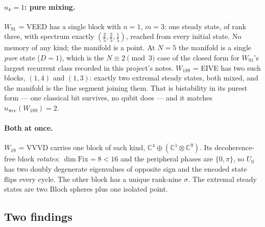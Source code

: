 \documentclass[11pt]{article}
\theoremstyle{plain}
\theoremstyle{definition}
\theoremstyle{remark}
\begin{document}
\paragraph{$n_k = 1$: pure mixing.} $W_{91}$ = VEED has a single block with $n =
1$, $m = 3$: one steady state, of rank three, with spectrum exactly
$(\tfrac25,\tfrac25,\tfrac15)$, reached from every initial state. No memory of
any kind; the manifold is a point. At $N = 5$ the manifold is a single
\emph{pure} state ($D = 1$), which is the $N \equiv 2 \pmod 3$ case of the
closed form for $W_{91}$'s largest recurrent class recorded in this project's
notes. $W_{189}$ = EIVE has two such blocks, $(1,4)$ and $(1,3)$: exactly two
extremal steady states, both mixed, and the manifold is the line segment
joining them. That is bistability in its purest form --- one classical bit
survives, no qubit does --- and it matches $n_{\mathrm{wcc}}(W_{189}) = 2$.

\paragraph{Both at once.} $W_{19}$ = VVVD carries one block of each kind,
$\mathbb{C}^4 \oplus (\mathbb{C}^1\otimes\mathbb{C}^9)$. Its
decoherence-free block \emph{rotates}: $\dim\mathrm{Fix} = 8 < 16$ and the
peripheral phases are $\{0,\pi\}$, so $U_0$ has two doubly degenerate
eigenvalues of opposite sign and the encoded state flips every cycle. The other
block has a unique rank-nine $\sigma$. The extremal steady states are two Bloch
spheres plus one isolated point.

\subsection{Two findings}
\end{document}
